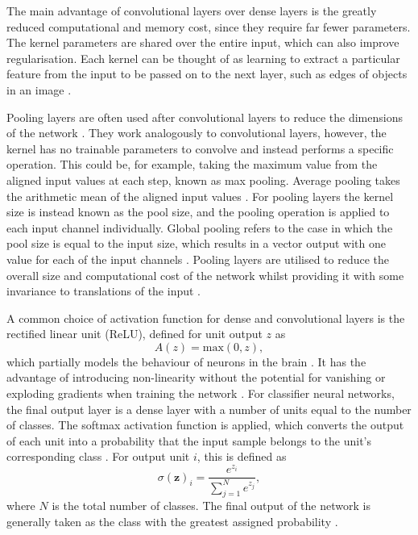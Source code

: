 \documentclass[12pt]{article}
\begin{document}
The main advantage of convolutional layers over dense layers is the greatly reduced computational and memory cost, since they require far fewer parameters. The kernel parameters are shared over the entire input, which can also improve regularisation. Each kernel can be thought of as learning to extract a particular feature from the input to be passed on to the next layer, such as edges of objects in an image \cite{Goodfellow16}.

Pooling layers are often used after convolutional layers to reduce the dimensions of the network \cite{Goodfellow16}. They work analogously to convolutional layers, however, the kernel has no trainable parameters to convolve and instead performs a specific operation. This could be, for example, taking the maximum value from the aligned input values at each step, known as max pooling. Average pooling takes the arithmetic mean of the aligned input values \cite{Aghdam17}. For pooling layers the kernel size is instead known as the pool size, and the pooling operation is applied to each input channel individually. Global pooling refers to the case in which the pool size is equal to the input size, which results in a vector output with one value for each of the input channels \cite{Aghdam17}. Pooling layers are utilised to reduce the overall size and computational cost of the network whilst providing it with some invariance to translations of the input \cite{Goodfellow16, Aghdam17}.

A common choice of activation function for dense and convolutional layers is the rectified linear unit (ReLU), defined for unit output $z$ as
\begin{equation}
A(z)=\mathrm{max}(0, z), \label{relu}
\end{equation}
which partially models the behaviour of neurons in the brain \cite{Glorot11}. It has the advantage of introducing non-linearity without the potential for vanishing or exploding gradients when training the network \cite{Goodfellow16, Glorot11}. For classifier neural networks, the final output layer is a dense layer with a number of units equal to the number of classes. The softmax activation function is applied, which converts the output of each unit into a probability that the input sample belongs to the unit's corresponding class \cite{Goodfellow16}. For output unit $i$, this is defined as
\begin{equation}
\sigma(\bm{z})_i=\frac{e^{z_i}}{\sum_{j=1}^Ne^{z_j}}, \label{softmax}
\end{equation}
where $N$ is the total number of classes. The final output of the network is generally taken as the class with the greatest assigned probability \cite{Goodfellow16}.
\end{document}
